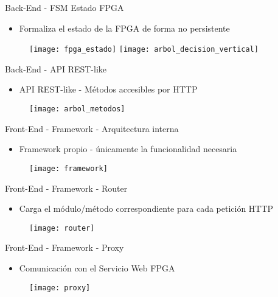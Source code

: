 \begin{frame}{Back-End - FSM Estado FPGA}
  \begin{itemize}
    \item Formaliza el estado de la FPGA de forma no persistente
  \end{itemize}
  \begin{figure}
    \texttt{[image: fpga\_estado]}
    \hfill
    \texttt{[image: arbol\_decision\_vertical]}
  \end{figure}
\end{frame}

\begin{frame}{Back-End - API REST-like}
  \begin{itemize}
    \item API REST-like - Métodos accesibles por HTTP
  \end{itemize}
  \begin{figure}
    \texttt{[image: arbol\_metodos]}
  \end{figure}
\end{frame}

\begin{frame}{Front-End - Framework - Arquitectura interna}
  \begin{itemize}
    \item Framework propio - únicamente la funcionalidad necesaria
  \end{itemize}
  \begin{figure}
    \texttt{[image: framework]}
  \end{figure}
\end{frame}

\begin{frame}{Front-End - Framework - Router}
  \begin{itemize}
    \item Carga el módulo/método correspondiente para cada petición HTTP
  \end{itemize}
  \begin{figure}
    \texttt{[image: router]}
  \end{figure}
\end{frame}

\begin{frame}{Front-End - Framework - Proxy}
  \begin{itemize}
    \item Comunicación con el Servicio Web FPGA
  \end{itemize}
  \begin{figure}
    \texttt{[image: proxy]}
  \end{figure}
\end{frame}

